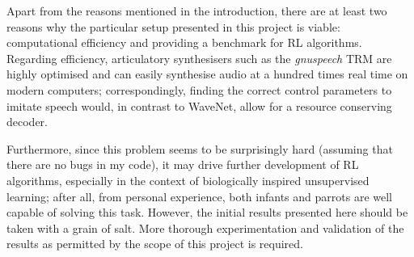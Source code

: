 \documentclass[letterpaper,10pt,conference]{ieeeconf}
\begin{document}
Apart from the reasons mentioned in the introduction, there are at least two reasons why the particular setup presented in this project is viable: computational efficiency and providing a benchmark for RL algorithms. Regarding efficiency, articulatory synthesisers such as the \emph{gnuspeech} TRM are highly optimised and can easily synthesise audio at a hundred times real time on modern computers; correspondingly, finding the correct control parameters to imitate speech would, in contrast to WaveNet, allow for a resource conserving decoder.

Furthermore, since this problem seems to be surprisingly hard (assuming that there are no bugs in my code), it may drive further development of RL algorithms, especially in the context of biologically inspired unsupervised learning; after all, from personal experience, both infants and parrots are well capable of solving this task. However, the initial results presented here should be taken with a grain of salt. More thorough experimentation and validation of the results as permitted by the scope of this project is required.

\printbibliography
\end{document}
